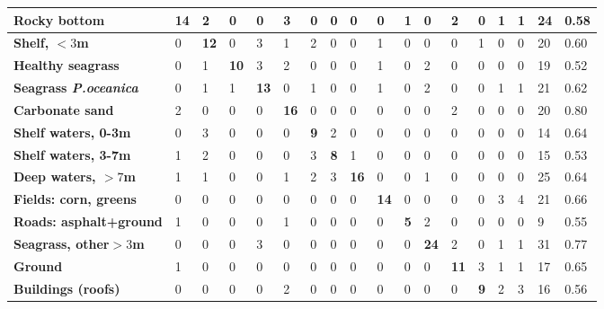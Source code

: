 \documentclass[11pt]{article}
\begin{document}
\begin{appendices}
\begin{table}[H]
\begin{tabular}{| p{1.7cm} | p{0.4cm}| p{0.4cm}|p{0.4cm}|p{0.4cm}|p{0.4cm}|p{0.4cm}|p{0.4cm}|p{0.4cm}|p{0.4cm}|p{0.4cm}|p{0.4cm}|p{0.4cm}|p{0.4cm}| p{0.4cm}| p{0.4cm}|| p{0.4cm}| p{0.4cm}|}
		\textbf{Rocky bottom}& \cellcolor{GreenYellow}\textbf{14} & 2 & 0 & 0 & 3 & 0 & 0 & 0 & 0 & 1 & 0 & 2 & 0 & 1 & 1 & \cellcolor{LightGoldenrodYellow}24 & 0.58 \\ \hline
		\textbf{Shelf, $<3$m} & 0 & \cellcolor{GreenYellow}\textbf{12} & 0 & 3 & 1 & 2 & 0& 0 & 1 & 0 & 0 & 0 & 1 & 0 & 0 & \cellcolor{LightGoldenrodYellow}20 & 0.60 \\ \hline
		\textbf{Healthy seagrass} & 0 & 1 & \cellcolor{GreenYellow}\textbf{10} & 3 & 2 & 0 & 0 & 0 & 1 & 0 & 2 & 0 & 0 & 0 & 0 & \cellcolor{LightGoldenrodYellow}19 & 0.52 \\ \hline
             	\textbf{Seagrass \textit{P.oceanica}} & 0 & 1 & 1 & \cellcolor{GreenYellow}\textbf{13} & 0 & 1 & 0 & 0 & 1 & 0 & 2 & 0 & 0 & 1 & 1 & \cellcolor{LightGoldenrodYellow}21 & 0.62 \\ \hline
		\textbf{Carbonate sand} & 2 & 0 & 0 & 0 & \cellcolor{GreenYellow}\textbf{16} & 0 & 0 & 0 & 0 & 0 & 0 & 2 & 0 & 0 & 0 & \cellcolor{LightGoldenrodYellow}20 & 0.80 \\ \hline
		\textbf{Shelf waters, 0-3m} & 0 & 3 & 0 & 0 & 0 & \cellcolor{GreenYellow}\textbf{9} & 2 & 0 & 0 & 0 & 0 & 0 & 0 & 0 & 0 & \cellcolor{LightGoldenrodYellow}14 & 0.64 \\ \hline
		\textbf{Shelf waters, 3-7m} & 1 & 2 & 0 & 0 & 0 & 3 & \cellcolor{GreenYellow}\textbf{8} & 1 & 0 & 0 & 0 & 0 & 0 & 0 & 0 & \cellcolor{LightGoldenrodYellow}15 & 0.53 \\ \hline
		\textbf{Deep waters, $>7$m} & 1 & 1 & 0 & 0 & 1 & 2 & 3 & \cellcolor{GreenYellow}\textbf{16} & 0 & 0 & 1 & 0 & 0 & 0 & 0 & \cellcolor{LightGoldenrodYellow}25 & 0.64 \\ \hline
		\textbf{Fields: corn, greens} & 0 & 0 & 0 & 0 & 0 & 0 & 0 & 0 & \cellcolor{GreenYellow}\textbf{14} & 0 & 0 & 0 & 0 & 3 & 4 & \cellcolor{LightGoldenrodYellow}21 & 0.66 \\ \hline
		\textbf{Roads: asphalt+ground} & 1 & 0 & 0 & 0 & 1 & 0 & 0 & 0 & 0 & \cellcolor{GreenYellow}\textbf{5} & 2 & 0 & 0 & 0 & 0 & \cellcolor{LightGoldenrodYellow}9 & 0.55 \\ \hline
		\textbf{Seagrass, other$>3$m} & 0 & 0 & 0 & 3 & 0 & 0 & 0 & 0 & 0 & 0 & \cellcolor{GreenYellow}\textbf{24} & 2 & 0 & 1 & 1 & \cellcolor{LightGoldenrodYellow}31 & 0.77 \\ \hline		
		\textbf{Ground} & 1 & 0 & 0 & 0 & 0 & 0 & 0 & 0 & 0 & 0 & 0 & \cellcolor{GreenYellow}\textbf{11} & 3 & 1 & 1 & \cellcolor{LightGoldenrodYellow}17 & 0.65 \\ \hline
		\textbf{Buildings (roofs)} & 0 & 0 & 0 & 0 & 2 & 0 & 0 & 0 & 0 & 0 & 0 & 0 & \cellcolor{GreenYellow}\textbf{9} & 2 & 3 &\cellcolor{LightGoldenrodYellow} 16 & 0.56 \\ \hline

\end{tabular}
\end{table}
\end{appendices}
\end{document}
